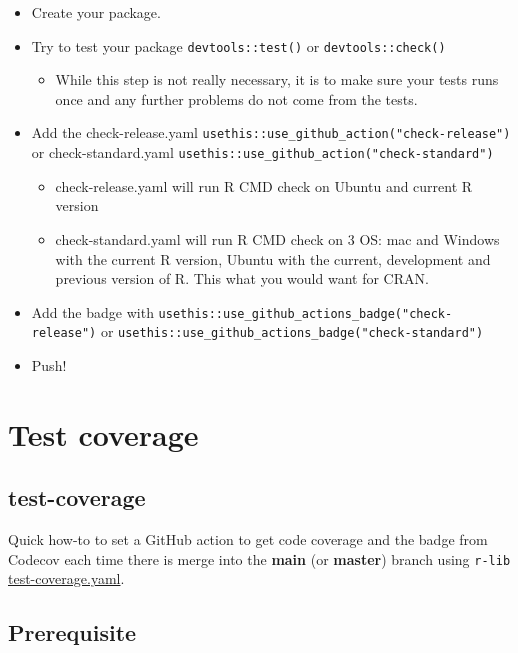 \documentclass[
]{book}
\providecommand{\tightlist}{%
  \setlength{\itemsep}{0pt}\setlength{\parskip}{0pt}}
\begin{document}
\begin{itemize}
\item
  Create your package.
\item
  Try to test your package \texttt{devtools::test()} or \texttt{devtools::check()}

  \begin{itemize}
  \tightlist
  \item
    While this step is not really necessary, it is to make sure your tests runs once and any further problems do not come from the tests.
  \end{itemize}
\item
  Add the check-release.yaml \texttt{usethis::use\_github\_action("check-release")} or check-standard.yaml \texttt{usethis::use\_github\_action("check-standard")}

  \begin{itemize}
  \tightlist
  \item
    check-release.yaml will run R CMD check on Ubuntu and current R version
  \item
    check-standard.yaml will run R CMD check on 3 OS: mac and Windows with the current R version, Ubuntu with the current, development and previous version of R. This what you would want for CRAN.
  \end{itemize}
\item
  Add the badge with \texttt{usethis::use\_github\_actions\_badge("check-release")} or \texttt{usethis::use\_github\_actions\_badge("check-standard")}
\item
  Push!
\end{itemize}

\hypertarget{test-coverage}{%
\chapter{Test coverage}\label{test-coverage}}

\hypertarget{test-coverage-1}{%
\section{test-coverage}\label{test-coverage-1}}

Quick how-to to set a GitHub action to get code coverage and the badge from Codecov each time there is merge into the \textbf{main} (or \textbf{master}) branch using \texttt{r-lib} \href{https://github.com/r-lib/actions/blob/v2-branch/examples/test-coverage.yaml}{test-coverage.yaml}.

\hypertarget{prerequisite-1}{%
\section{Prerequisite}\label{prerequisite-1}}
\end{document}

